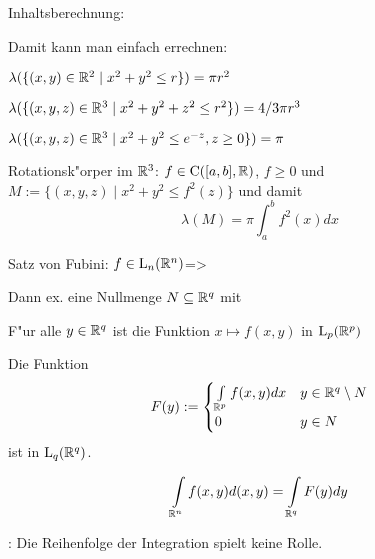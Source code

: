 \example Inhaltsberechnung:{
  Damit kann man einfach errechnen:
  \begin{stmts}
    \item $\lambda(\{(x,y)\in\mathbb R^2\mid x^2+y^2\le r \})=\pi r^2$
    \item $\lambda(\{(x,y,z)\in\mathbb R^3\mid x^2+y^2+z^2\le r^2 \})=4/3 \pi r^3$
    \item $\lambda(\{(x,y,z)\in\mathbb R^3\mid x^2+y^2\le e^{-z},z\ge 0\})=\pi$
    \item Rotationsk"orper im $\mathbb R^3$: $f\in{\rm C}([a,b],\mathbb R)$, $f\ge 0$ und
      \break
      $M:=\{(x,y,z)\mid x^2+y^2\le f^2(z)\}$ und damit
      \[\lambda(M)=\pi\int_a^b f^2(x) dx
        \]
    \end{stmts}
  }
\theorem Satz von Fubini:
  $f\in{\rm L}_n(\mathbb R^n)$=>{
  Dann ex. eine Nullmenge $N\subseteq\mathbb R^q$ mit
  \begin{stmts}
    \item F"ur alle $y\in\mathbb R^q$ ist die Funktion $x\mapsto f(x,y)$ 
      in ${\rm L}_p(\mathbb R^p)$
    \item Die Funktion
      \[F(y):=\begin{cases}
	  \int_{\SetR^p} f(x,y) dx & y\in\SetR^q\setminus N \\
	  0 & y\in N
	  \end{cases}
        \]
      ist in ${\rm L}_q(\mathbb R^q)$.
    \item 
      \[\int_{\SetR^n} f(x,y) d(x,y) =\int_{\SetR^q} F(y) dy
        \]
    \end{stmts}
  }
\remark:{
  Die Reihenfolge der Integration spielt keine Rolle.
  }
